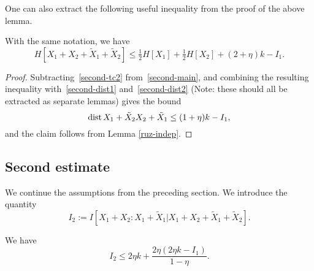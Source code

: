One can also extract the following useful inequality from the proof of the above lemma.

\begin{lemma}\label{foursum-bound}
  With the same notation, we have
  \begin{equation}
    \label{HS-bound}
    H[X_1+X_2+\tilde X_1+\tilde X_2] \le \tfrac{1}{2} H[X_1]+\tfrac{1}{2} H[X_2] + (2 + \eta) k - I_1.
  \end{equation}
\end{lemma}

\begin{proof}
  Subtracting~\eqref{second-tc2} from~\eqref{second-main}, and combining the resulting inequality with~\eqref{second-dist1} and~\eqref{second-dist2} (Note: these should all be extracted as separate lemmas) gives the bound
\[
  \operatorname{dist}{X_1+\tilde X_2}{X_2+\tilde X_1} \le (1 + \eta) k - I_1,
\]
and the claim follows from Lemma \ref{ruz-indep}.
\end{proof}


\subsection{Second estimate}

We continue the assumptions from the preceding section.
We introduce the quantity
$$ I_2 := I[ X_1+X_2 : X_1 + \tilde X_1 | X_1+X_2+\tilde X_1+\tilde X_2 ].$$

\begin{lemma}\label{second-estimate}
We have
$$ I_2 \leq 2 \eta k + \frac{2 \eta (2 \eta k - I_1)}{1 - \eta}.$$
\end{lemma}

